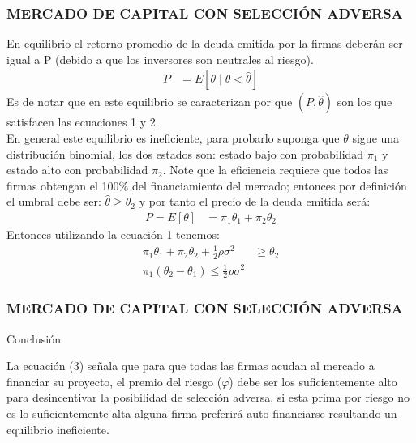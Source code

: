 \documentclass[10pt, xcolor=table, x11names]{beamer}
\begin{document}
\begin{frame}
    \frametitle{{\normalsize MERCADO DE CAPITAL CON SELECCIÓN ADVERSA} {}}
    En equilibrio el retorno promedio de la deuda emitida por la firmas deberán ser igual a P (debido a que los inversores son neutrales al riesgo).\\
    \begin{align}
    P&=E[\theta\mid\theta<\hat{\theta}]
    \end{align}
    Es de notar que en este equilibrio se caracterizan por que $(P, \hat{\theta})$ son los que satisfacen las ecuaciones 1 y 2.\\
    En general este equilibrio es ineficiente, para probarlo suponga que $\theta $ sigue una distribución binomial, los dos estados son: estado bajo con probabilidad $\pi_{1}$ y estado alto con probabilidad $\pi_{2}$. Note que la eficiencia requiere que todos las firmas obtengan el 100\% del financiamiento del mercado; entonces por definición el umbral debe ser: $\hat{\theta}\geq \theta_{2} $ y por tanto el precio de la deuda emitida será:
    \begin{align}
    P=E[\theta]&=\pi_{1}\theta_{1}+\pi_{2}\theta_{2} \nonumber
    \end{align}
     Entonces utilizando la ecuación 1 tenemos:
     \begin{align}
     \pi_{1}\theta_{1}+\pi_{2}\theta_{2}+\frac{1}{2}\rho\sigma^{2}&\geq \theta_{2}\nonumber \\
     \pi_{1}(\theta_{2}-\theta_{1})\leq\frac{1}{2}\rho\sigma^{2}
     \end{align}
\end{frame}


\begin{frame}
    \frametitle{{\normalsize MERCADO DE CAPITAL CON SELECCIÓN ADVERSA} {}}
    
    \begin{block} {Conclusión}
       
            La ecuación (3) señala que para que todas las firmas acudan al mercado a financiar su proyecto, el premio del riesgo ($\varphi$) debe ser los suficientemente alto para desincentivar la posibilidad de selección adversa, si esta prima por riesgo no es lo suficientemente alta alguna firma preferirá auto-financiarse resultando un equilibrio ineficiente.
         
    \end{block}	

   
\end{frame}
\end{document}
